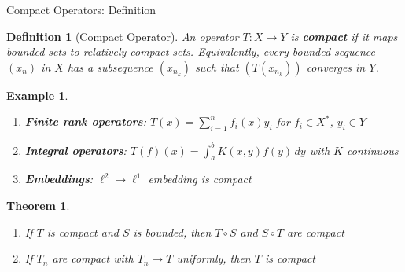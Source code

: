 \documentclass[aspectratio=169,10pt]{beamer}
\newtheorem{defn}{Definition}
\newtheorem{thm}{Theorem}
\newtheorem{ex}{Example}
\begin{document}
\begin{frame}{Compact Operators: Definition}
  \begin{defn}[Compact Operator]
    An operator $T: X \to Y$ is \textbf{compact} if it maps bounded sets to relatively compact sets. Equivalently, every bounded sequence $(x_n)$ in $X$ has a subsequence $(x_{n_k})$ such that $(T(x_{n_k}))$ converges in $Y$.
  \end{defn}

  \vspace{0.3cm}
  \begin{ex}
    \begin{enumerate}
      \item \textbf{Finite rank operators}: $T(x) = \sum_{i=1}^n f_i(x) y_i$ for $f_i \in X^*$, $y_i \in Y$
      \item \textbf{Integral operators}: $T(f)(x) = \int_a^b K(x,y) f(y) \, dy$ with $K$ continuous
      \item \textbf{Embeddings}: $\ell^2 \to \ell^1$ embedding is compact
    \end{enumerate}
  \end{ex}

  \vspace{0.3cm}
  \begin{thm}
    \begin{enumerate}
      \item If $T$ is compact and $S$ is bounded, then $T \circ S$ and $S \circ T$ are compact
      \item If $T_n$ are compact with $T_n \to T$ uniformly, then $T$ is compact
    \end{enumerate}
  \end{thm}
\end{frame}
\end{document}
